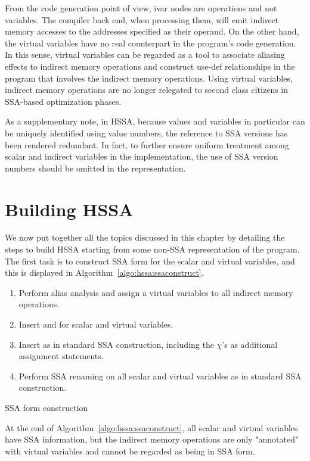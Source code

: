 From the code generation point of view, ivar nodes are operations and not variables.  The compiler back end, when processing them, will emit indirect memory accesses to the addresses specified as their operand.
On the other hand, the virtual variables have no real counterpart in the
program's code generation.
In this sense, virtual variables can be regarded as a tool to associate aliasing effects to indirect memory operations and construct use-def relationships in
the program that involves the indirect memory operations.
Using virtual variables, indirect memory operations are no longer relegated to
second class citizens in SSA-based optimization phases.

As a supplementary note, in HSSA, because values and variables in particular 
can be uniquely identified using value numbers, the reference to SSA versions 
has been rendered redundant.  In fact, to further ensure uniform treatment
among scalar and indirect variables in the implementation, the use of
SSA version numbers should be omitted in the representation.


\section{Building HSSA}
We now put together all the topics discussed in this chapter by detailing the
steps to build HSSA starting from some non-SSA representation of the program.
The first task is to construct SSA form for the scalar and virtual variables,
and this is displayed in Algorithm~\ref{algo:hssa:ssaconstruct}.

\begin{algorithm}[H]
\LinesNumbered
\begin{enumerate}
\item Perform alias analysis and assign a virtual variables to all indirect memory operations.
\item Insert \mufuns and \chifuns for scalar and virtual variables.
\item Insert \phifuns as in standard SSA construction, including the $\chi$'s as additional assignment statements.
\item Perform SSA renaming on all scalar and virtual variables as in standard SSA construction.
\end{enumerate}
\caption{\label{algo:hssa:ssaconstruct}SSA form construction}
\end{algorithm}

At the end of Algorithm~\ref{algo:hssa:ssaconstruct}, all scalar and virtual
variables have SSA information, but the
indirect memory operations are only "annotated" with virtual variables and
cannot be regarded as being in SSA form.

